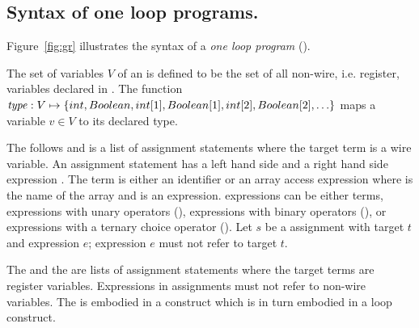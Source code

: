 \subsection{Syntax of one loop programs.}
%

Figure~\ref{fig:gr} illustrates the syntax of a 
{\em one loop program} (\caig).


\begin{definition}
The set of \caig variables $V$ of an \caig is defined to be 
the set of all non-wire, i.e. register,  variables declared in .
The function $\mathit{type}: V \mapsto \{ int, Boolean, int[1], Boolean[1], int[2], Boolean[2], \ldots \}$ maps a variable
$v \in V$ to its declared type. 
\end{definition}


The  follows  and is a list 
of assignment statements where the target term is a wire 
variable. 
An assignment statement has a left hand side  and 
a right hand side expression . 
The term is either an identifier  or an array 
access expression  where  is the name
of the array and  is an expression. 
\caig expressions can be either terms, expressions with unary
operators (\cci{-,!}), expressions with binary operators (\cci{+,-,*,/,<,>,<=,>=,==,\&\&,||}), 
or expressions with a ternary choice operator 
(). 
Let $s$ be a  assignment with target $t$ and 
expression $e$; expression $e$ must not refer to target $t$. 



The  and the  are lists 
of assignment statements where the target terms are register variables.
Expressions in  assignments 
must not refer to non-wire
variables. 
The  is embodied in a  construct
which is in turn embodied in a  loop construct. 



